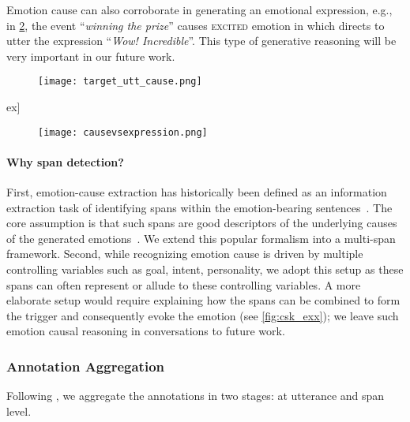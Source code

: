 \documentclass[smallextended]{svjour3}
\newcommand\emo[1]{\textsc{#1}}
\newcommand\ToDeleteIfNeedSpace{}
\newcommand\0{\hphantom{0}}
\begin{document}
\ToDeleteIfNeedSpace Emotion cause can also corroborate in generating an emotional expression, e.g., in \cref{fig:causevsexpression}, the event ``\textit{winning the prize}'' causes \emo{excited} emotion in  which directs  to utter the expression ``\textit{Wow! Incredible}''. This type of generative reasoning will be very important in our future work.

\begin{figure*}[t]
     \centering
     \begin{subfigure}[b]{60ex}
         \centering
         \texttt{[image: target\_utt\_cause.png]}
         \caption{}
         \label{fig:emotion_in_target}
     \end{subfigure}
\3ex]
     \begin{subfigure}[b]{60ex}
         \centering
         \texttt{[image: causevsexpression.png]}
         \caption{}
         \label{fig:causevsexpression}
     \end{subfigure}
     \caption{{() No context. {()} Unmentioned latent cause. {(}) Distinguishing emotion cause from emotional expressions}.}
\end{figure*}



\paragraph{Why span detection?}
First, emotion-cause extraction has historically been defined as an information extraction task of identifying spans within the emotion-bearing sentences~\cite{DBLP:conf/acl/XiaD19,DBLP:conf/cicling/GhaziIS15}. The core assumption is that such spans are good descriptors of the underlying causes of the generated emotions~\cite{talmy2000toward}. We extend this popular formalism into a multi-span framework.
Second, while recognizing emotion cause is driven by multiple controlling variables such as goal, intent, personality, we adopt this setup as these spans can often represent or allude to these controlling variables. A more elaborate setup would require explaining how the spans can be combined to form the trigger and consequently evoke the emotion (see \cref{fig:csk_exx}); we leave such emotion causal reasoning in conversations to future work.


\subsubsection{Annotation Aggregation}
Following \citet{gui2016event}, we aggregate the annotations in two stages: 
at utterance and span level.
\end{document}
